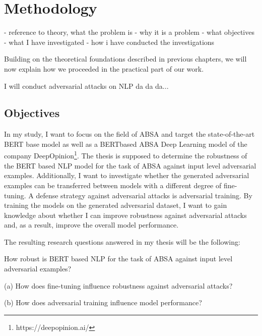 
\section{Methodology}

- reference to theory, what the problem is
- why it is a problem
- what objectives
- what I have investigated
- how i have conducted the investigations


Building on the theoretical foundations described in previous chapters, we will now explain how we proceeded in the practical part of our work. 



I will conduct adversarial attacks on NLP da da da...




\subsection{Objectives}


In my study, I want to focus on the field of ABSA and target the state-of-the-art BERT base model as well as a BERTbased ABSA Deep Learning model of the company DeepOpinion\footnote{https://deepopinion.ai/}. The thesis is supposed to determine the robustness of the BERT based NLP model for the task of ABSA against input level adversarial examples.
Additionally, I want to investigate whether the generated adversarial examples can be transferred between models with a different degree of fine-tuning. A defense strategy against adversarial attacks is adversarial training. By training the models on the generated adversarial dataset, I want to gain knowledge about whether I can improve robustness against adversarial attacks and, as a result, improve the overall model performance.

The resulting research questions answered in my thesis will be the following:

How robust is BERT based NLP for the task of ABSA against input level adversarial examples?

(a) How does fine-tuning influence robustness against adversarial attacks?

(b) How does adversarial training influence model performance?

